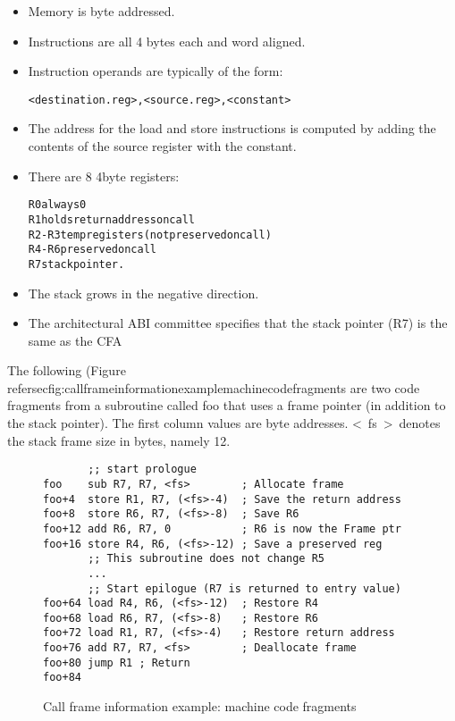 \begin{itemize}
\item Memory is byte addressed.

\item Instructions are all 4 bytes each and word aligned.

\item Instruction operands are typically of the form:

\begin{alltt}
<destination.reg>, <source.reg>, <constant>
\end{alltt}

\item The address for the load and store instructions is computed
by adding the contents of the
source register with the constant.

\item There are 8 4\dash byte registers:

\begin{alltt}
R0 always 0
R1 holds return address on call
R2-R3 temp registers (not preserved on call)
R4-R6 preserved on call
R7 stack pointer.
\end{alltt}

\item  The stack grows in the negative direction.

\item The architectural ABI committee specifies that the
stack pointer (R7) is the same as the CFA

\end{itemize}

The following 
(Figure refersec{fig:callframeinformationexamplemachinecodefragments}
are two code fragments from a subroutine called
foo that uses a frame pointer (in addition to the stack
pointer). The first column values are byte addresses. 
\textless~fs~\textgreater \  denotes the stack frame size in bytes, namely 12.


\begin{figure}[here]
\begin{lstlisting}
       ;; start prologue
foo    sub R7, R7, <fs>        ; Allocate frame
foo+4  store R1, R7, (<fs>-4)  ; Save the return address
foo+8  store R6, R7, (<fs>-8)  ; Save R6
foo+12 add R6, R7, 0           ; R6 is now the Frame ptr
foo+16 store R4, R6, (<fs>-12) ; Save a preserved reg
       ;; This subroutine does not change R5
       ...
       ;; Start epilogue (R7 is returned to entry value)
foo+64 load R4, R6, (<fs>-12)  ; Restore R4
foo+68 load R6, R7, (<fs>-8)   ; Restore R6
foo+72 load R1, R7, (<fs>-4)   ; Restore return address
foo+76 add R7, R7, <fs>        ; Deallocate frame
foo+80 jump R1 ; Return
foo+84
\end{lstlisting}
\caption{Call frame information example: machine code fragments} \label{fig:callframeinformationexamplemachinecodefragments}
\end{figure}


